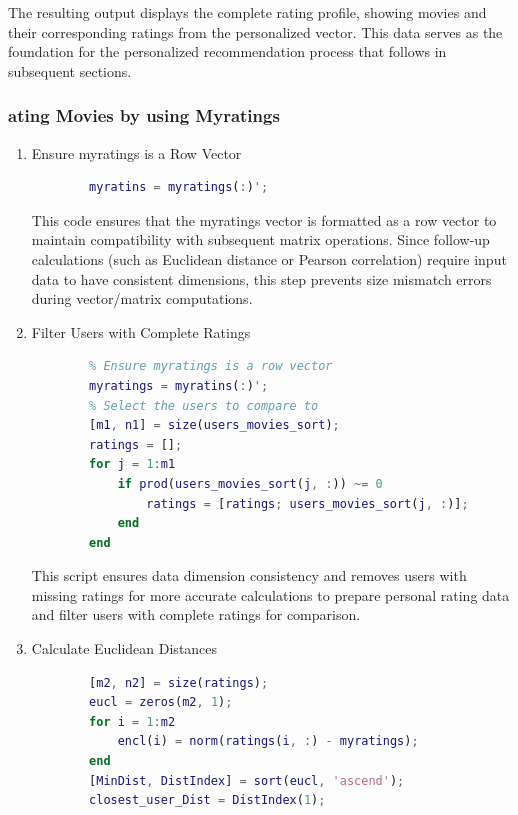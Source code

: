 The resulting output displays the complete rating profile, showing movies and their corresponding ratings from the personalized vector. This data serves as the foundation for the personalized recommendation process that follows in subsequent sections.

\subsubsection{ating Movies by using Myratings}

\begin{enumerate}[label=\alph*.]
	\item Ensure myratings is a Row Vector
	
	\begin{lstlisting}[style=StyleCode, language=MATLAB]
		% Ensure myratins is a row vector
		myratins = myratings(:)';
	\end{lstlisting}
	
	This code ensures that the myratings vector is formatted as a row vector to maintain compatibility with subsequent matrix operations. Since follow-up calculations (such as Euclidean distance or Pearson correlation) require input data to have consistent dimensions, this step prevents size mismatch errors during vector/matrix computations.
	
	\item Filter Users with Complete Ratings
	
	\begin{lstlisting}[style=StyleCode, language=MATLAB]
		% Personal Recommendations using myratins
		% Ensure myratings is a row vector
		myratings = myratins(:)';
		% Select the users to compare to 
		[m1, n1] = size(users_movies_sort);
		ratings = [];
		for j = 1:m1
			if prod(users_movies_sort(j, :)) ~= 0
				ratings = [ratings; users_movies_sort(j, :)];
			end
		end
	\end{lstlisting}
	
	This script ensures data dimension consistency and removes users with missing ratings for more accurate calculations to prepare personal rating data and filter users with complete ratings for comparison.
	
	\item Calculate Euclidean Distances
	
	\begin{lstlisting}[style=StyleCode, language=MATLAB]
		% Find the Euclidean distance
		[m2, n2] = size(ratings);
		eucl = zeros(m2, 1);
		for i = 1:m2
			encl(i) = norm(ratings(i, :) - myratings);
		end
		[MinDist, DistIndex] = sort(eucl, 'ascend');
		closest_user_Dist = DistIndex(1);
	\end{lstlisting}
	

\end{enumerate}
